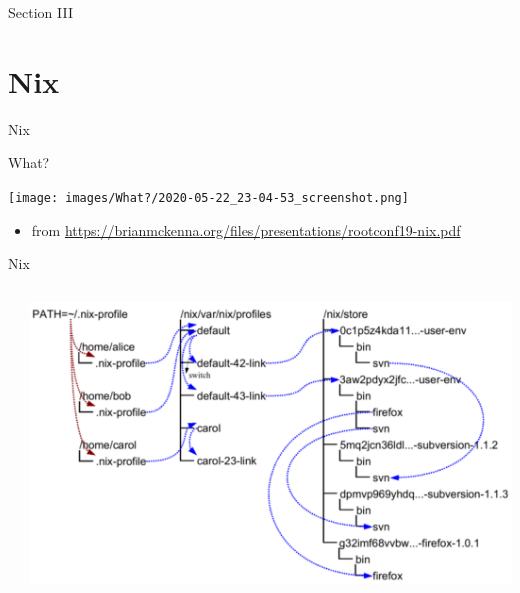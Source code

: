 \documentclass[bigger,unknownkeysallowed,aspectratio=169,red,colorblocks]{beamer}
\begin{document}
\begin{frame}[label={sec:org9c20a44},standout]{Section III}
\section{Nix}
\begin{center}
  \Huge Nix
\end{center}
\end{frame}
\begin{frame}[label={sec:org5ca6ba0}]{What?}
\begin{center}
\texttt{[image: images/What?/2020-05-22\_23-04-53\_screenshot.png]}
\end{center}
\begin{itemize}
\item \tiny from \url{https://brianmckenna.org/files/presentations/rootconf19-nix.pdf}
\end{itemize}
\end{frame}
\begin{frame}[label={sec:org080a46e}]{Nix}
\begin{columns}
\begin{column}{0.4\columnwidth}
\end{column}

\begin{column}{0.6\columnwidth}
\begin{center}
\includegraphics[width=.9\linewidth]{images/A_screenshot/2020-05-22_23-15-22_screenshot.png}
\end{center}
\end{column}
\end{columns}
\end{frame}
\end{document}
